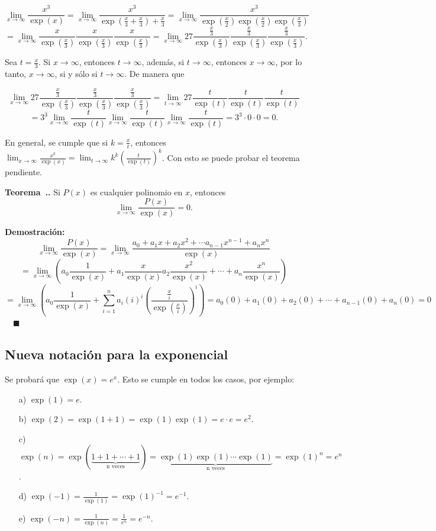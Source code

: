 \documentclass{article}
\numberwithin{equation}{section}
\newcommand{\Col}{\color{ProcessBlue}}
\newcommand{\col}[1]{\textcolor{ProcessBlue}{#1}}
\newcommand{\limf}[1]{\lim_{#1\to\infty}}
\newcommand{\suma}[3]{\sum_{#1}^{#2}{#3}}
\newcounter{theorem}[section]
\newenvironment
{theorem}[1][]
{\vspace{0.5cm}\refstepcounter{theorem}\par\medskip\noindent\textbf{\Col Teorema~\thesection.\thetheorem. #1}\rmfamily}
{}
\newenvironment
{proof}
{\par\medskip\noindent\textbf{Demostración:}\rmfamily}
{\Col\hfill$\quad \blacksquare$\vspace{0.5cm}}
\begin{document}
$$ \lim_{x\to\infty}\frac{x^3}{\exp(x)}=\lim_{x\to\infty}\frac{x^3}{\exp(\frac{x}{3}+\frac{x}{3})+\frac{x}{3}}=\lim_{x\to\infty}\frac{x^3}{\exp(\frac{x}{2})\exp(\frac{x}{2})\exp(\frac{x}{3})}$$
$$=\lim_{x\to\infty}\frac{x}{\exp(\frac{x}{3})}\frac{x}{\exp(\frac{x}{3})}\frac{x}{\exp(\frac{x}{3})}=\lim_{x\to\infty}27\frac{\frac{x}{3}}{\exp(\frac{x}{3})}\frac{\frac{x}{3}}{\exp(\frac{x}{3})}\frac{\frac{x}{3}}{\exp(\frac{x}{3})}.$$

Sea $t=\frac{x}{3}$. Si $x\to \infty$, entonces $t\to \infty$, además, si $t\to \infty$, entonces $x\to \infty$, por lo tanto, $x\to \infty$, si y sólo si $t\to \infty$. De manera que

$$ \lim_{x\to\infty}27\frac{\frac{x}{3}}{\exp(\frac{x}{3})}\frac{\frac{x}{3}}{\exp(\frac{x}{3})}\frac{\frac{x}{3}}{\exp(\frac{x}{3})}=\lim_{t\to\infty}27\frac{t}{\exp(t)}\frac{t}{\exp(t)}\frac{t}{\exp(t)}$$
$$=3^3\lim_{x\to\infty}\frac{t}{\exp(t)}\lim_{x\to\infty}\frac{t}{\exp(t)}\lim_{x\to\infty}\frac{t}{\exp(t)}=3^3\cdot 0\cdot 0=0.$$

\vspace{0.5cm}

En general, se cumple que si $k=\frac{x}{t}$, entonces $\lim_{x\to\infty}\frac{x^k}{\exp(x)}=\lim_{t\to\infty}k^k\left(\frac{t}{\exp(t)}\right)^k$. Con esto se puede probar el teorema pendiente.

\begin{theorem}
    Si $P(x)$ es cualquier polinomio en $x$, entonces 
    $$\lim_{x\to\infty}\frac{P(x)}{\exp(x)}=0.$$
\end{theorem}

\begin{proof}
    $$\limf{x}\frac{P(x)}{\exp(x)}=\limf{x}\frac{a_0+a_1x+a_2x^2+\cdots a_{n-1}x^{n-1}+a_nx^n}{\exp(x)}$$
    $$=\limf{x}\left( a_0\frac{1}{\exp(x)}+a_1\frac{x}{\exp(x)} a_2\frac{x^2}{\exp(x)}+\cdots+a_n\frac{x^n}{\exp(x)} \right)$$
    $$=\limf{x}\left( a_0\frac{1}{\exp(x)}+\suma{i=1}{n}{a_i(i)^{i}\left(\frac{\frac{x}{i}}{\exp(\frac{x}{i})}\right)^{i}} \right)=a_0(0)+a_1(0)+a_2(0)+\cdots+a_{n-1}(0)+a_n(0)=0$$
\end{proof}

\subsection{\col{Nueva notación para la exponencial}}

Se probará que $\exp(x)=e^x$. Esto se cumple en todos los casos, por ejemplo:

\begin{enumerate}
    \item[a)] $\exp(1)=e$.
    \item[b)] $\exp(2)=\exp(1+1)=\exp(1)\exp(1)=e\cdot e=e^2$.
    \item[c)] $\exp(n)=\exp(\underbrace{1+1+\cdots+1}_{\mbox{n veces}})=\underbrace{\exp(1)\exp(1)\cdots\exp(1)}_{\mbox{n veces}}=\exp(1)^n=e^n$.
    \item[d)] $\exp(-1)=\frac{1}{\exp(1)}=\exp(1)^{-1}=e^{-1}$.
    \item[e)] $\exp(-n)=\frac{1}{\exp(n)}=\frac{1}{e^n}=e^{-n}$.
\end{enumerate}
\end{document}
